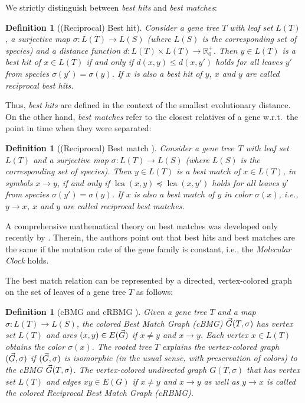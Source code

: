 \documentclass[hidelinks,11pt]{scrreprt}
\DeclareMathOperator{\lca}{lca}
\newtheorem{definition}[theorem]{Definition}
\def\arrowedvec{\mathaccent"017E}
\newcommand{\G}{\arrowedvec{G}}
\begin{document}
We strictly distinguish between \emph{best hits} and \emph{best matches}:

\begin{definition}[(Reciprocal) Best hit]
	\label{def:best_hit}
	Consider a gene tree $T$ with leaf set $L(T)$, a surjective map $\sigma\colon L(T)\to L(S)$ (where $L(S)$ is the corresponding set of species) and a distance function $d:L(T)\times L(T)\to \mathbb{R}_0^+$.  Then $y\in L(T)$ is a \emph{best hit} of $x\in L(T)$ if and only if $d(x,y)\le d(x,y')$ holds for all leaves $y'$ from species $\sigma(y')=\sigma(y)$.\newline
	If $x$ is also a best hit of $y$, $x$ and $y$ are called \emph{reciprocal best hits}.
\end{definition}

Thus, \emph{best hits} are defined in the context of the smallest evolutionary distance. On the other hand, \emph{best matches} refer to the closest relatives of a gene w.r.t.\ the point in time when they were separated:

\begin{definition}[(Reciprocal) Best match {\citep{geiss2019a}}]
	\label{def:best_match}
	Consider a gene tree~$T$ with leaf set $L(T)$ and a surjective map $\sigma\colon L(T)\to L(S)$ (where $L(S)$ is the corresponding set of species).  Then $y\in L(T)$ is a \emph{best match} of $x\in L(T)$, in symbols $x\rightarrow y$, if and only if $\lca(x,y)\preceq \lca(x,y')$ holds for all leaves $y'$ from species $\sigma(y')=\sigma(y)$.\newline
	If $x$ is also a best match of $y$ in color $\sigma(x)$, i.e., $y\rightarrow x$, $x$ and $y$ are called \emph{reciprocal best matches}.
\end{definition}

A comprehensive mathematical theory on best matches was developed only recently by \citet{geiss2019a}. Therein, the authors point out that best hits and best matches are the same if the mutation rate of the gene family is constant, i.e., the \emph{Molecular Clock} holds.

The best match relation can be represented by a directed, vertex-colored graph on the set of leaves of a gene tree $T$ as follows:

\begin{definition}[cBMG and cRBMG {\citep{geiss2019a}}]
	\label{def:cBMG}
	Given a gene tree $T$ and a map $\sigma:L(T)\to L(S)$, the \emph{colored Best Match Graph (cBMG)} $\protect\G(T,\sigma)$ has vertex set $L(T)$ and arcs $(x,y)\in E(\protect\G)$ if $x\ne y$ and $x\rightarrow y$. Each vertex $x\in L(T)$ obtains the color $\sigma(x)$.  \newline The rooted tree $T$ \emph{explains} the vertex-colored graph $(\protect\G,\sigma)$ if $(\protect\G,\sigma)$ is isomorphic (in the usual sense, with preservation of colors) to the cBMG $\protect\G(T,\sigma)$.\newline
	The vertex-colored undirected graph $G(T,\sigma)$ that has vertex set $L(T)$ and edges $xy\in E(G)$ if $x\ne y$ and $x\rightarrow y$ as well as $y\rightarrow x$ is called the \emph{colored Reciprocal Best Match Graph (cRBMG).}
\end{definition}
\end{document}
